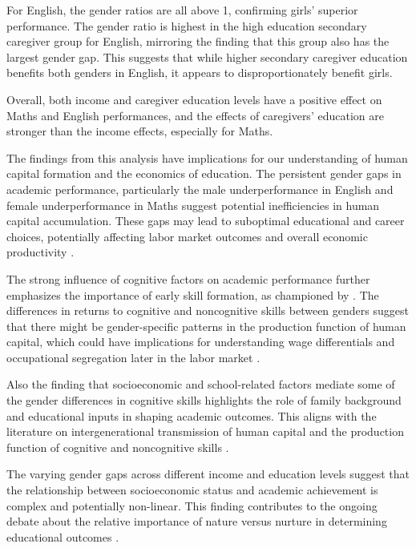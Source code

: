 \documentclass[12pt,a4paper,onecolumn]{article}
\numberwithin{equation}{section}
\begin{document}
For English, the gender ratios are all above 1, confirming girls' superior performance. The gender ratio is highest in the high education secondary caregiver group for English, mirroring the finding that this group also has the largest gender gap. This suggests that while higher secondary caregiver education benefits both genders in English, it appears to disproportionately benefit girls.

Overall, both income and caregiver education levels have a positive effect on Maths and English performances, and the effects of caregivers' education are stronger than the income effects, especially for Maths. 

The findings from this analysis have implications for our understanding of human capital formation and the economics of education. The persistent gender gaps in academic performance, particularly the male underperformance in English and female underperformance in Maths suggest potential inefficiencies in human capital accumulation. These gaps may lead to suboptimal educational and career choices, potentially affecting labor market outcomes and overall economic productivity \parencite{altonji1999race}.

The strong influence of cognitive factors on academic performance further emphasizes the importance of early skill formation, as championed by \textcite{heckman2006skill}. The differences in returns to cognitive and noncognitive skills between genders suggest that there might be gender-specific patterns in the production function of human capital, which could have implications for understanding wage differentials and occupational segregation later in the labor market \parencite{blau2017gender}.

Also the finding that socioeconomic and school-related factors mediate some of the gender differences in cognitive skills highlights the role of family background and educational inputs in shaping academic outcomes. This aligns with the literature on intergenerational transmission of human capital and the production function of cognitive and noncognitive skills \parencite{cunha2007technology}.

The varying gender gaps across different income and education levels suggest that the relationship between socioeconomic status and academic achievement is complex and potentially non-linear. This finding contributes to the ongoing debate about the relative importance of nature versus nurture in determining educational outcomes \parencite{sacerdote2011nature}.
\end{document}
